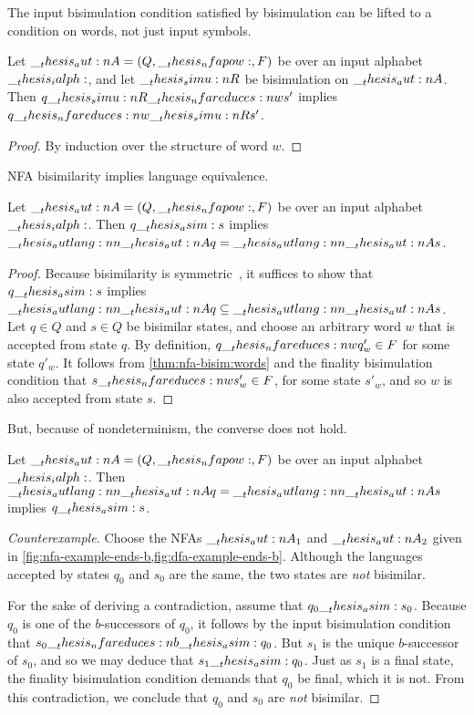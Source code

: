 The input bisimulation condition satisfied by  bisimulation can be lifted to a condition on words, not just input symbols.
%
\begin{theorem}\label{thm:nfa-bisim:words}
  Let $\__thesis_aut:n {A} = (Q, \__thesis_nfapow:, F)$ be  over an input alphabet $\__thesis_ialph:$, and let $\__thesis_simu:n {R}$ be  bisimulation on $\__thesis_aut:n {A}$.
  Then $q \simu{R}\nfareduces[w] s'$ implies $q \nfareduces[w]\simu{R} s'$.
\end{theorem}
%
\begin{proof}
  By induction over the structure of word $w$.
\end{proof}


\Ac{NFA} bisimilarity implies language equivalence.
%
\begin{theorem}
  Let $\__thesis_aut:n {A} = (Q, \__thesis_nfapow:, F)$ be  over an input alphabet $\__thesis_ialph:$.
  Then $q \__thesis_asim: s$ implies $\__thesis_autlang:nn {\__thesis_aut:n {A}} {q} = \__thesis_autlang:nn {\__thesis_aut:n {A}} {s}$.
\end{theorem}
%
\begin{proof}
  Because bisimilarity is symmetric~, it suffices to show that $q \__thesis_asim: s$ implies $\__thesis_autlang:nn {\__thesis_aut:n {A}} {q} \subseteq \__thesis_autlang:nn {\__thesis_aut:n {A}} {s}$.
  Let $q \in Q$ and $s \in Q$ be bisimilar states, and choose an arbitrary word $w$ that is accepted from state $q$.
  By definition, $q \nfareduces[w] q'_w \in F$ for some state $q'_w$.
  It follows from \cref{thm:nfa-bisim:words} and the finality bisimulation condition that $s \nfareduces[w] s'_w \in F$, for some state $s'_w$, and so $w$ is also accepted from state $s$.
\end{proof}

But, because of nondeterminism, the converse does not hold.
\begin{falseclaim}
  Let $\__thesis_aut:n {A} = (Q, \__thesis_nfapow:, F)$ be  over an input alphabet $\__thesis_ialph:$.
  Then $\__thesis_autlang:nn {\__thesis_aut:n {A}} {q} = \__thesis_autlang:nn {\__thesis_aut:n {A}} {s}$ implies $q \__thesis_asim: s$.
\end{falseclaim}
%
\begin{proof}[Counterexample]
  Choose the \acp{NFA} $\__thesis_aut:n {A}_1$ and $\__thesis_aut:n {A}_2$ given in \cref{fig:nfa-example-ends-b,fig:dfa-example-ends-b}.
  Although the languages accepted by states $q_0$ and $s_0$ are the same, the two states are \emph{not} bisimilar.

  For the sake of deriving a contradiction, assume that $q_0 \__thesis_asim: s_0$.
  Because $q_0$ is one of the $b$-successors of $q_0$, it follows by the input bisimulation condition that $s_0 \nfareduces[\smash{b}]\asim q_0$.
  But $s_1$ is the unique $b$-successor of $s_0$, and so we may deduce that $s_1 \__thesis_asim: q_0$.
  Just as $s_1$ is a final state, the finality bisimulation condition demands that $q_0$ be final, which it is not.
  From this contradiction, we conclude that $q_0$ and $s_0$ are \emph{not} bisimilar. 
\end{proof}

